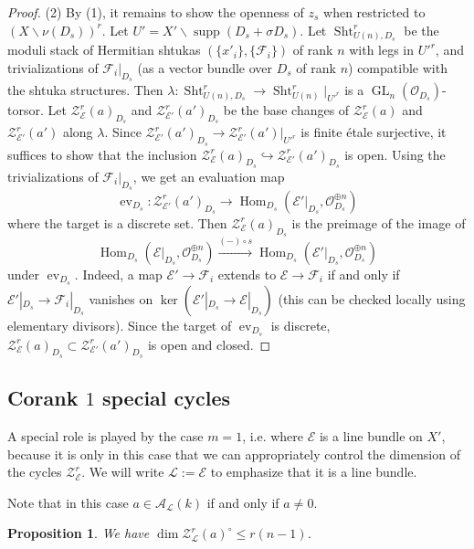 \documentclass[reqno]{amsart}
\numberwithin{equation}{section}
\newcommand{\Cal}[1]{\mathcal{#1}}
\newcommand{\bs}{\backslash}
\newcommand{\inj}{\hookrightarrow}
\DeclareMathOperator{\GL}{GL}
\DeclareMathOperator{\Hom}{Hom}
\DeclareMathOperator{\Sht}{Sht}
\DeclareMathOperator{\supp}{supp}
\DeclareMathOperator{\ev}{ev}
\newcommand\xr{\xrightarrow}
\newcommand\op{\oplus}
\renewcommand\c{\circ}
\newcommand{\s}{\sigma}
\renewcommand{\l}{\lambda}
\newcommand\cA{\mathcal{A}}
\newcommand\cE{\mathcal{E}}
\newcommand\cF{\mathcal{F}}
\newcommand\cL{\mathcal{L}}
\newcommand\cO{\mathcal{O}}
\newcommand\cZ{\mathcal{Z}}
\newtheorem{prop}[thm]{Proposition}
\theoremstyle{remark}
\numberwithin{equation}{section}
\begin{document}
\begin{proof}
(2) By (1),  it remains to show the openness of $z_s$ when restricted to $(X\bs \nu(D_{s}))^{r}$. Let $U'=X'\bs \supp(D_{s}+\s D_{s})$. Let $\Sht^{r}_{U(n),D_{s}}$ be the moduli stack of Hermitian shtukas $(\{x'_{i}\}, \{\cF_{i}\})$ of rank $n$ with legs in $U'^{r}$, and trivializations of $\cF_{i}|_{D_{s}}$ (as a vector bundle over $D_{s}$ of rank $n$) compatible with the shtuka structures. Then $\l: \Sht^{r}_{U(n),D_{s}}\to \Sht^{r}_{U(n)}|_{U'^{r}}$ is a $\GL_{n}(\cO_{D_{s}})$-torsor. Let $\cZ^{r}_{\cE}(a)_{D_{s}}$ and $\cZ^{r}_{\cE'}(a')_{D_{s}}$ be the base changes of $\cZ^{r}_{\cE}(a)$ and $\cZ^{r}_{\cE'}(a')$ along $\l$. Since $\cZ^{r}_{\cE'}(a')_{D_{s}}\to \cZ^{r}_{\cE'}(a')|_{U'^{r}}$ is finite \'etale surjective, it suffices to show that the inclusion $\cZ^{r}_{\cE}(a)_{D_{s}}\inj \cZ^{r}_{\cE'}(a')_{D_{s}}$ is open. Using the trivializations of $\cF_{i}|_{D_{s}}$, we get an evaluation map
\begin{equation}
\ev_{D_{s}}: \cZ^{r}_{\cE'}(a')_{D_{s}}\to \Hom_{D_{s}}(\cE'|_{D_{s}}, \cO_{D_{s}}^{\op n})
\end{equation}
where the target is a discrete set. Then $\cZ^{r}_{\cE}(a)_{D_{s}}$ is the preimage of the image of
\begin{equation}
\Hom_{D_{s}}(\cE|_{D_{s}}, \cO_{D_{s}}^{\op n}) \xr{(-)\c s} \Hom_{D_{s}}(\cE'|_{D_{s}}, \cO_{D_{s}}^{\op n})
\end{equation}
under $\ev_{D_{s}}$. Indeed, a map $\cE'\to \cF_{i}$ extends to $\cE\to \cF_{i}$ if and only if $\cE'|_{D_{s}}\to \cF_{i}|_{D_{s}}$ vanishes on $\ker(\cE'|_{D_{s}}\to \cE|_{D_{s}})$ (this can be checked locally using elementary divisors). Since the target of $\ev_{D_{s}}$ is discrete, $\cZ^{r}_{\cE}(a)_{D_{s}}\subset \cZ^{r}_{\cE'}(a')_{D_{s}}$ is open and closed.
\end{proof}


\subsection{Corank $1$ special cycles} 

A special role is played by the case $m=1$, i.e. where $\Cal{E}$ is a line bundle on $X'$, because it is only in this case that we can appropriately control the dimension of the cycles $\Cal{Z}_{\Cal{E}}^{r}$. We will write $\Cal{L} := \Cal{E}$ to emphasize that it is a line bundle. 

Note that in this case $a \in \cA_{\cL}(k)$ if and only if $a \neq 0$. 

\begin{prop}\label{prop: dim Z_L}
We have $\dim \cZ_{\cL}^{r}(a)^{\circ} \leq r(n-1)$. 
\end{prop}
\end{document}
